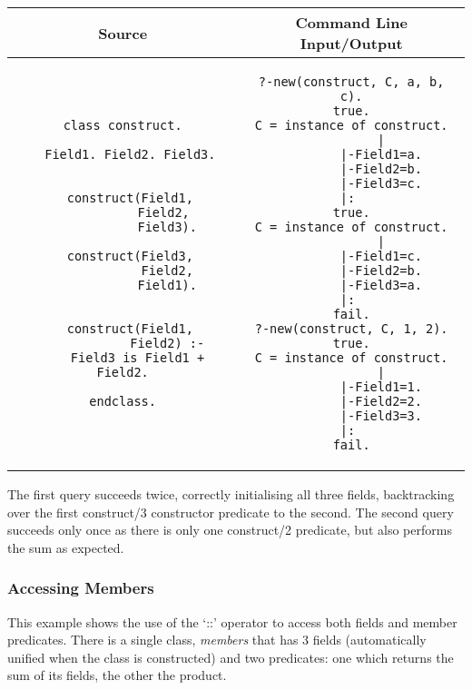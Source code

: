\documentclass[12pt,a4paper,twoside,openright]{report}
\begin{document}
\begin{center}
\begin{tabular}{c|c}
	Source & Command Line Input/Output \\
	\hline
	\small
\begin{lstlisting}
class construct.

  Field1. Field2. Field3.

		
  construct(Field1,
            Field2, 
            Field3).
  
  construct(Field3,
            Field2,
            Field1).


  construct(Field1,
            Field2) :-
    Field3 is Field1 + Field2.
    
endclass.
\end{lstlisting}

&
	\small
\begin{lstlisting}
?-new(construct, C, a, b, c).
true.
C = instance of construct.
        |
        |-Field1=a.
        |-Field2=b.
        |-Field3=c.
|: 
true.
C = instance of construct.
        |
        |-Field1=c.
        |-Field2=b.
        |-Field3=a.
|: 
fail.
?-new(construct, C, 1, 2).
true.
C = instance of construct.
        |
        |-Field1=1.
        |-Field2=2.
        |-Field3=3.
|: 
fail.
\end{lstlisting}

\\
\end{tabular}
\end{center}

The first query succeeds twice, correctly initialising all three fields, backtracking over the first construct/3 constructor predicate to the second. The second query succeeds only once as there is only one construct/2 predicate, but also performs the sum as expected.

	\subsubsection{Accessing Members}
	
This example shows the use of the `::' operator to access both fields and member predicates. There is a single class, \emph{members} that has 3 fields (automatically unified when the class is constructed) and two predicates: one which returns the sum of its fields, the other the product.
	
\end{document}
